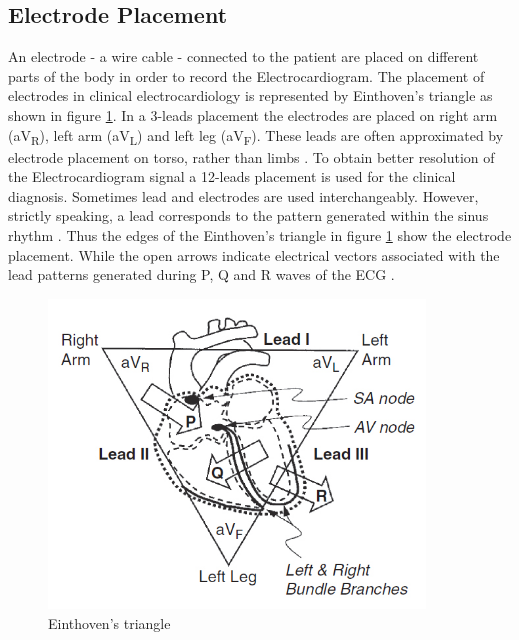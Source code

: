 \subsection{Electrode Placement} 
\label{sec:einthoven} An electrode - a wire cable - connected to the patient are placed on different parts of the body in order to record the Electrocardiogram. The placement of electrodes in clinical electrocardiology is represented by Einthoven's triangle as shown in figure \ref{fig:einthoven_triangle}. In a 3-leads placement the electrodes are placed on right arm (aV\textsubscript{R}), left arm (aV\textsubscript{L}) and left leg (aV\textsubscript{F}). These leads are often approximated by electrode placement on torso, rather than limbs \cite{cacioppo_cardiovascular_2016_p_183_216}. To obtain better resolution of the Electrocardiogram signal a 12-leads placement is used for the clinical diagnosis. Sometimes lead and electrodes are used interchangeably. However, strictly speaking, a lead corresponds to the pattern generated within the sinus rhythm \cite{hampton_ecg_2013}. Thus the edges of the Einthoven's triangle in figure \ref{fig:einthoven_triangle} show the electrode placement. While the open arrows indicate electrical vectors associated with the lead patterns generated during P, Q and R waves of the ECG \cite{cacioppo_cardiovascular_2016_p_183_216}.

\begin{figure}
    \centering
    \includegraphics[width=100mm]{Figures/einthoven_triangle.jpg}
    \caption{Einthoven's triangle \cite{cacioppo_cardiovascular_2016_p_183_216}}
    \label{fig:einthoven_triangle}
\end{figure}

